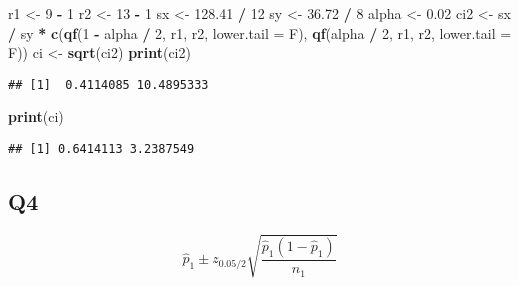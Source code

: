 \documentclass[
]{book}
\newenvironment{Shaded}{\begin{snugshade}}{\end{snugshade}}
\newcommand{\DataTypeTok}[1]{\textcolor[rgb]{0.13,0.29,0.53}{#1}}
\newcommand{\DecValTok}[1]{\textcolor[rgb]{0.00,0.00,0.81}{#1}}
\newcommand{\FloatTok}[1]{\textcolor[rgb]{0.00,0.00,0.81}{#1}}
\newcommand{\KeywordTok}[1]{\textcolor[rgb]{0.13,0.29,0.53}{\textbf{#1}}}
\newcommand{\NormalTok}[1]{#1}
\newcommand{\OperatorTok}[1]{\textcolor[rgb]{0.81,0.36,0.00}{\textbf{#1}}}
\newcommand{\StringTok}[1]{\textcolor[rgb]{0.31,0.60,0.02}{#1}}
\theoremstyle{definition}
\theoremstyle{definition}
\theoremstyle{definition}
\theoremstyle{remark}
\begin{document}
\begin{Shaded}
\begin{Highlighting}[]
\NormalTok{r1 <-}\StringTok{ }\DecValTok{9} \OperatorTok{-}\StringTok{ }\DecValTok{1}
\NormalTok{r2 <-}\StringTok{ }\DecValTok{13} \OperatorTok{-}\StringTok{ }\DecValTok{1}
\NormalTok{sx <-}\StringTok{ }\FloatTok{128.41} \OperatorTok{/}\StringTok{ }\DecValTok{12}
\NormalTok{sy <-}\StringTok{ }\FloatTok{36.72} \OperatorTok{/}\StringTok{ }\DecValTok{8}
\NormalTok{alpha <-}\StringTok{ }\FloatTok{0.02}
\NormalTok{ci2 <-}\StringTok{ }\NormalTok{sx }\OperatorTok{/}\StringTok{ }\NormalTok{sy }\OperatorTok{*}\StringTok{ }\KeywordTok{c}\NormalTok{(}\KeywordTok{qf}\NormalTok{(}\DecValTok{1} \OperatorTok{-}\StringTok{ }\NormalTok{alpha }\OperatorTok{/}\StringTok{ }\DecValTok{2}\NormalTok{, r1, r2, }\DataTypeTok{lower.tail =}\NormalTok{ F), }\KeywordTok{qf}\NormalTok{(alpha }\OperatorTok{/}\StringTok{ }\DecValTok{2}\NormalTok{, r1, r2, }\DataTypeTok{lower.tail =}\NormalTok{ F))}
\NormalTok{ci <-}\StringTok{ }\KeywordTok{sqrt}\NormalTok{(ci2)}
\KeywordTok{print}\NormalTok{(ci2)}
\end{Highlighting}
\end{Shaded}

\begin{verbatim}
## [1]  0.4114085 10.4895333
\end{verbatim}

\begin{Shaded}
\begin{Highlighting}[]
\KeywordTok{print}\NormalTok{(ci)}
\end{Highlighting}
\end{Shaded}

\begin{verbatim}
## [1] 0.6414113 3.2387549
\end{verbatim}

\hypertarget{q4-2}{%
\subsection{Q4}\label{q4-2}}

\[
\hat{p}_{1} \pm z_{0.05 / 2} \sqrt{\frac{\hat{p}_{1}\left(1-\hat{p}_{1}\right)}{n_{1}}}
\]
\end{document}
